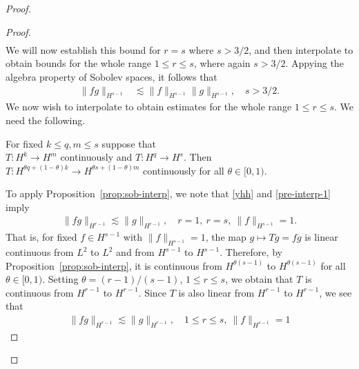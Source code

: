 \begin{proof}
\begin{proof}
\begin{equation}
\begin{split}
\end{split}
\end{equation}
We will now establish this bound for $r=s$ where $s > 3/2$, and then interpolate to obtain
bounds for the whole range $1 \le r \le s$, where again $s > 3/2$. Appying the
algebra property of Sobolev spaces, it follows that
%
%
\begin{equation}
  \label{pre-interp-1}
\begin{split}
  \| f g \|_{H^{s-1}}
  & \lesssim   \|f  \|_{H^{s-1}} \| g \|_{H^{s-1}}, \quad s >3/2.
\end{split}
\end{equation}
%
%
%
%
%
%
%
We now wish to interpolate to obtain estimates for the whole range $1 \le r \le s$.
We need the following.
%
%
%
%
%                
%
%
%
%
\begin{proposition}
  For fixed $k \le q, m \le s$ suppose that \\ $T: H^{k} \to H^{m}$ continuously
and $T: H^{q} \to H^{s}$. Then\\ $T: H^{\theta q + (1 - \theta)k} \to H^{\theta
s + (1 - \theta) m}$ continuously for all $\theta \in [0,1)$.
\label{prop:sob-interp}
\end{proposition}
%
To apply Proposition~\ref{prop:sob-interp}, we note that \eqref{yhh}
and \eqref{pre-interp-1} imply
%
%
\begin{equation*}
\begin{split}
  \| f g \|_{H^{r-1}} \lesssim \| g \|_{H^{r-1}}, \quad
  r=1, \  r =s, \ \| f \|_{H^{s-1}} =1.
\end{split}
\end{equation*}
%
%
That is, for fixed $f \in H^{s-1}$ with $\| f \|_{H^{s-1}} =1$, the map $g \mapsto
Tg = fg$ is linear continuous from $L^{2}$ to $L^{2}$ and from $H^{s-1}$ to
$H^{s-1}$. Therefore, by Proposition~\ref{prop:sob-interp}, it is continuous from
$H^{\theta (s-1) }$ to $H^{\theta (s-1)}$ for all $\theta \in
[0, 1)$. Setting $\theta = (r-1)/(s-1)$, $ 1 \le r \le s$, we obtain that $T$ is
continuous from $H^{r-1}$ to $H^{r-1}$. Since $T$ is also linear from $H^{r-1}$
to $H^{r-1}$, we see that 
%
%
\begin{equation*}
\begin{split}
  \| f g \|_{H^{r-1}} \lesssim \| g \|_{H^{r-1}}, \quad 1 \le r \le s, \
  \| f \|_{H^{s-1}} =1
\end{split}
\end{equation*}

\end{proof}
\end{proof}
